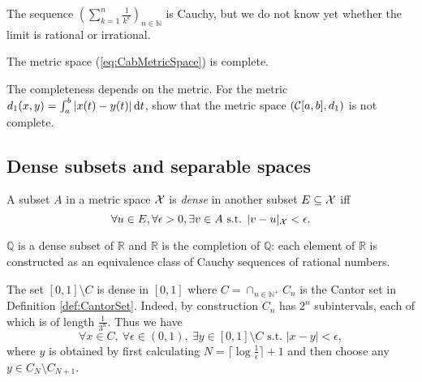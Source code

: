\begin{exm}
  The sequence $(\sum_{k=1}^n\frac{1}{k^k})_{n\in\mathbb{N}}$
  is Cauchy, 
  but we do not know yet
  whether the limit is rational or irrational.
\end{exm}


\begin{lem}
  \label{lem:CabMetricSpace}
  The metric space (\ref{eq:CabMetricSpace}) is complete.
\end{lem}


\begin{exc}
  The completeness depends on the metric.
  For the metric 
  $d_1(x,y)=\int_a^b|x(t)-y(t)|\,\mathrm{d} t$,
  show that the metric space $({\cal C}[a,b],d_1)$
  is not complete.
\end{exc}


\subsection{Dense subsets and separable spaces}
\label{sec:dense-subsets}

\begin{defn}
  \label{def:denseSetMetricSpace}
  A subset $A$ in a metric space ${\cal X}$
  is \emph{dense} in another subset $E\subseteq {\cal X}$
  iff
  \begin{equation}
    \label{eq:denseSet}
    \forall u\in E, \forall \epsilon>0, \exists v\in A
    \text{ s.t. } |v-u|_{\cal X} < \epsilon.
  \end{equation}
\end{defn}

\begin{exm}
  \label{exm:QisDenseInR}
  $\mathbb{Q}$ is a dense subset of $\mathbb{R}$
  and $\mathbb{R}$ is the completion of $\mathbb{Q}$:
  each element of $\mathbb{R}$ is constructed
  as an equivalence class of Cauchy sequences of rational numbers.
\end{exm}


\begin{exm}
  \label{exm:CantorSetRemovedDense}
  The set $[0,1]\setminus C$ is dense in $[0,1]$
  where $C=\cap_{n\in \mathbb{N}^+} C_n$ is the Cantor set
  in Definition \ref{def:CantorSet}.
  Indeed, by construction $C_n$ has $2^{n}$ subintervals,
  each of which is of length $\frac{1}{3^n}$.
  Thus we have
  \begin{displaymath}
    \forall x\in C,\ \forall \epsilon\in (0,1),\
    \exists y\in [0,1]\setminus C \text{ s.t. }
    |x-y|<\epsilon,
  \end{displaymath}
  where $y$ is obtained by first calculating
  $N=\lceil \log\frac{1}{\epsilon}\rceil+1$
  and then choose any $y\in C_N\setminus C_{N+1}$.
\end{exm}

